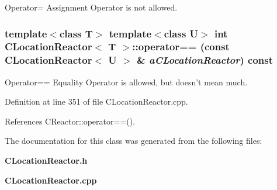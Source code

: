 Operator= Assignment Operator is not allowed.

\subsubsection{\setlength{\rightskip}{0pt plus 5cm}template$<$class T$>$ template$<$class U$>$ int CLocation\-Reactor$<$ T $>$::operator== (const CLocation\-Reactor$<$ U $>$ \& {\em a\-CLocation\-Reactor}) const}\label{classCLocationReactor_a4}


Operator== Equality Operator is allowed, but doesn't mean much.



Definition at line 351 of file CLocation\-Reactor.cpp.

References CReactor::operator==().

The documentation for this class was generated from the following files:\begin{CompactItemize}
\item 
{\bf CLocation\-Reactor.h}\item 
{\bf CLocation\-Reactor.cpp}\end{CompactItemize}
